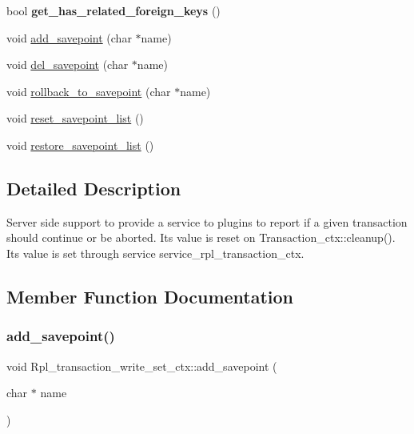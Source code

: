 \begin{DoxyCompactItemize}
\mbox{\label{classRpl__transaction__write__set__ctx_a04b997cd4231150844b794282ddd9bf2}} 
bool {\bfseries get\+\_\+has\+\_\+related\+\_\+foreign\+\_\+keys} ()
\item 
void \mbox{\hyperlink{classRpl__transaction__write__set__ctx_a9a0fb568601fb81236c84fbdbd308a0b}{add\+\_\+savepoint}} (char $\ast$name)
\item 
void \mbox{\hyperlink{classRpl__transaction__write__set__ctx_ab9bb7799dbea3999e441aa53245267a3}{del\+\_\+savepoint}} (char $\ast$name)
\item 
void \mbox{\hyperlink{classRpl__transaction__write__set__ctx_a6b1fa58962e012c29871668e207eae1f}{rollback\+\_\+to\+\_\+savepoint}} (char $\ast$name)
\item 
void \mbox{\hyperlink{classRpl__transaction__write__set__ctx_a00245209aabac640cbdcbee2b47c865d}{reset\+\_\+savepoint\+\_\+list}} ()
\item 
void \mbox{\hyperlink{classRpl__transaction__write__set__ctx_abab0107db18fb3f09c63fd4c458d6060}{restore\+\_\+savepoint\+\_\+list}} ()
\end{DoxyCompactItemize}


\subsection{Detailed Description}
Server side support to provide a service to plugins to report if a given transaction should continue or be aborted. Its value is reset on Transaction\+\_\+ctx\+::cleanup(). Its value is set through service service\+\_\+rpl\+\_\+transaction\+\_\+ctx. 

\subsection{Member Function Documentation}
\mbox{\label{classRpl__transaction__write__set__ctx_a9a0fb568601fb81236c84fbdbd308a0b}} 
\subsubsection{\texorpdfstring{add\+\_\+savepoint()}{add\_savepoint()}}
{\footnotesize\ttfamily void Rpl\+\_\+transaction\+\_\+write\+\_\+set\+\_\+ctx\+::add\+\_\+savepoint (\begin{DoxyParamCaption}\item[{char $\ast$}]{name }\end{DoxyParamCaption})}

